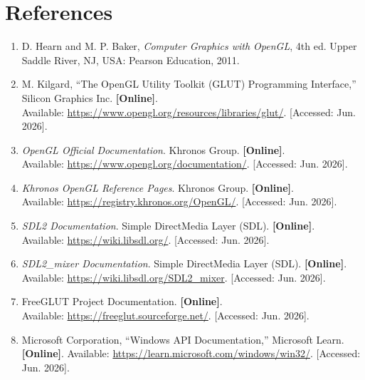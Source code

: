 \documentclass[12pt,a4paper]{report}
\begin{document}
\chapter*{References}


\begin{enumerate}

\item D. Hearn and M. P. Baker, \textit{Computer Graphics with OpenGL}, 4th ed. Upper Saddle River, NJ, USA: Pearson Education, 2011.

\item M. Kilgard, ``The OpenGL Utility Toolkit (GLUT) Programming Interface,'' Silicon Graphics Inc. \textbf{[Online]}.\\ Available: \href{https://www.opengl.org/resources/libraries/glut/}{https://www.opengl.org/resources/libraries/glut/}. [Accessed: Jun. 2026].

\item \textit{OpenGL Official Documentation}. Khronos Group. \textbf{[Online]}.\\ Available: \href{https://www.opengl.org/documentation/}{https://www.opengl.org/documentation/}. [Accessed: Jun. 2026].

\item \textit{Khronos OpenGL Reference Pages}. Khronos Group. \textbf{[Online]}.\\ Available: \href{https://registry.khronos.org/OpenGL/}{https://registry.khronos.org/OpenGL/}. [Accessed: Jun. 2026].

\item \textit{SDL2 Documentation}. Simple DirectMedia Layer (SDL). \textbf{[Online]}.\\ Available: \href{https://wiki.libsdl.org/}{https://wiki.libsdl.org/}. [Accessed: Jun. 2026].

\item \textit{SDL2\_mixer Documentation}. Simple DirectMedia Layer (SDL). \textbf{[Online]}.\\ Available: \href{https://wiki.libsdl.org/SDL2_mixer}{https://wiki.libsdl.org/SDL2\_mixer}. [Accessed: Jun. 2026].

\item FreeGLUT Project Documentation. \textbf{[Online]}.\\ Available: \href{https://freeglut.sourceforge.net/}{https://freeglut.sourceforge.net/}. [Accessed: Jun. 2026].

\item Microsoft Corporation, ``Windows API Documentation,'' Microsoft Learn. \textbf{[Online]}. Available: \href{https://learn.microsoft.com/windows/win32/}{https://learn.microsoft.com/windows/win32/}. [Accessed: Jun. 2026].


\end{enumerate}
\end{document}
